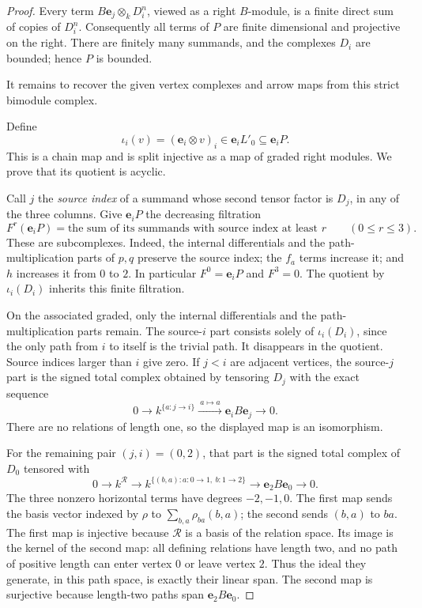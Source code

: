 \begin{proof}
Every term \(B\mathbf e_j\otimes_k D_i^n\), viewed as a right
\(B\)-module, is a finite direct sum of copies of \(D_i^n\).
Consequently all terms of \(P\) are finite dimensional and projective
on the right.  There are finitely many summands, and the complexes
\(D_i\) are bounded; hence \(P\) is bounded.

It remains to recover the given vertex complexes and arrow maps from
this strict bimodule complex.

Define
\[
 \iota_i(v)=(\mathbf e_i\otimes v)_i
       \in \mathbf e_iL'_0\subseteq \mathbf e_iP .
\]
This is a chain map and is split injective as a map of graded right
modules.  We prove that its quotient is acyclic.

Call \(j\) the \emph{source index} of a summand whose second tensor
factor is \(D_j\), in any of the three columns.  Give
\(\mathbf e_iP\) the decreasing filtration
\[
 F^r(\mathbf e_iP)
  =\text{the sum of its summands with source index at least }r
  \qquad (0\leq r\leq 3).
\]
These are subcomplexes.  Indeed, the internal differentials and the
path-multiplication parts of \(p,q\) preserve the source index;
the \(f_a\) terms increase it; and \(h\) increases it from \(0\)
to \(2\).  In particular \(F^0=\mathbf e_iP\) and \(F^3=0\).
The quotient by \(\iota_i(D_i)\) inherits this finite filtration.

On the associated graded, only the internal differentials and the
path-multiplication parts remain.  The source-\(i\) part consists
solely of \(\iota_i(D_i)\), since the only path from \(i\) to itself
is the trivial path.  It disappears in the quotient.  Source indices
larger than \(i\) give zero.  If \(j<i\) are adjacent vertices, the
source-\(j\) part is the signed total complex obtained by tensoring
\(D_j\) with the exact sequence
\[
 0\longrightarrow
 k^{\{a:j\to i\}}
 \xrightarrow{\ a\mapsto a\ }
 \mathbf e_iB\mathbf e_j
 \longrightarrow 0.
\]
There are no relations of length one, so the displayed map is an
isomorphism.

For the remaining pair \((j,i)=(0,2)\), that part is the signed total
complex of \(D_0\) tensored with
\[
 0\longrightarrow k^{\mathcal R}
 \longrightarrow k^{\{(b,a):a:0\to1,\ b:1\to2\}}
 \longrightarrow \mathbf e_2B\mathbf e_0
 \longrightarrow 0.
\]
The three nonzero horizontal terms have degrees \(-2,-1,0\).
The first map sends the basis vector indexed by \(\rho\) to
\(\sum_{b,a}\rho_{ba}(b,a)\); the second sends \((b,a)\) to \(ba\).
The first map is injective because \(\mathcal R\) is a basis of the
relation space.  Its image is the kernel of the second map: all
defining relations have length two, and no path of positive length
can enter vertex \(0\) or leave vertex \(2\).  Thus the ideal they
generate, in this path space, is exactly their linear span.  The
second map is surjective because length-two paths span
\(\mathbf e_2B\mathbf e_0\).


\end{proof}
